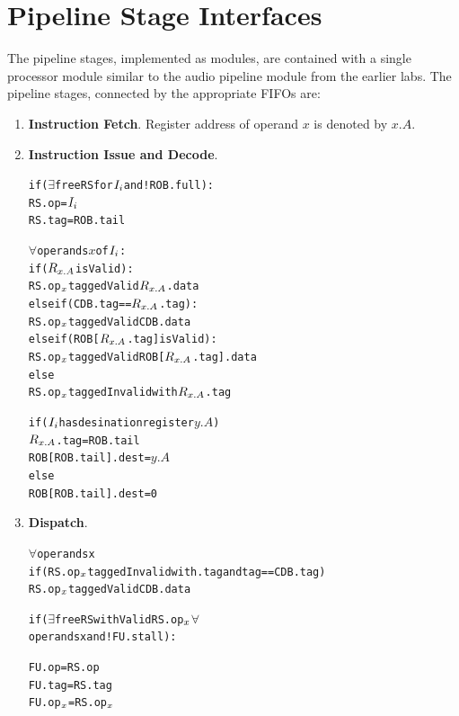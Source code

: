 \documentclass[12pt]{article}
\newcommand{\mtt}[1]{\(#1\)}
\begin{document}
\section{Pipeline Stage Interfaces}
The pipeline stages, implemented as modules, are contained with a single processor module similar to the audio 
pipeline module from the earlier labs. The pipeline stages, connected by the appropriate FIFOs are:
\begin{enumerate}
    \item \textbf{Instruction Fetch}. Register address of operand $x$ is denoted by $x.A$.
        
    \item \textbf{Instruction Issue and Decode}.
       \begin{alltt}
           if (\mtt{\exists} free RS for \mtt{I\sb{i}} and !ROB.full):
               RS.op =  \mtt{I\sb{i}}
               RS.tag = ROB.tail
               
               \mtt{\forall} operands \mtt{x} of \mtt{I\sb{i}}:
                   if (\mtt{R\sb{x.A}} is Valid):
                       RS.op\mtt{\sb{x}} tagged Valid \mtt{R\sb{x.A}}.data
                   else if (CDB.tag == \mtt{R\sb{x.A}}.tag):
                       RS.op\mtt{\sb{x}} tagged Valid CDB.data
                   else if (ROB[\mtt{R\sb{x.A}}.tag] is Valid):
                       RS.op\mtt{\sb{x}} tagged Valid ROB[\mtt{R\sb{x.A}}.tag].data
                   else
                       RS.op\mtt{\sb{x}} tagged Invalid with \mtt{R\sb{x.A}}.tag
                       
               if (\mtt{I\sb{i}} has desination register \mtt{y.A})
                   \mtt{R\sb{x.A}}.tag = ROB.tail
                   ROB[ROB.tail].dest = \mtt{y.A}
               else
                   ROB[ROB.tail].dest = 0
       \end{alltt}
    \item \textbf{Dispatch}.
        \begin{alltt}
            \mtt{\forall} operands x
                if (RS.op\mtt{\sb{x}} tagged Invalid with .tag and tag == CDB.tag)
                    RS.op\mtt{\sb{x}} tagged Valid CDB.data
        \end{alltt}
    
        \begin{alltt}
            if (\mtt{\exists} free RS with Valid RS.op\mtt{\sb{x}} \mtt{\forall}
                operands x and !FU.stall):
                
                FU.op = RS.op
                FU.tag = RS.tag
                FU.op\mtt{\sb{x}} = RS.op\mtt{\sb{x}}
        \end{alltt}
        

\end{enumerate}
\end{document}
